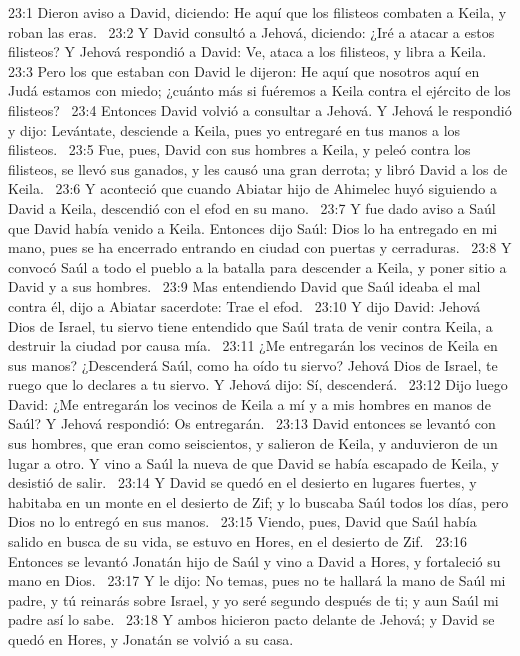 23:1 Dieron aviso a David, diciendo: He aquí que los filisteos combaten a Keila, y roban las eras.  
23:2 Y David consultó a Jehová, diciendo: ¿Iré a atacar a estos filisteos? Y Jehová respondió a David: Ve, ataca a los filisteos, y libra a Keila.  
23:3 Pero los que estaban con David le dijeron: He aquí que nosotros aquí en Judá estamos con miedo; ¿cuánto más si fuéremos a Keila contra el ejército de los filisteos?  
23:4 Entonces David volvió a consultar a Jehová. Y Jehová le respondió y dijo: Levántate, desciende a Keila, pues yo entregaré en tus manos a los filisteos.  
23:5 Fue, pues, David con sus hombres a Keila, y peleó contra los filisteos, se llevó sus ganados, y les causó una gran derrota; y libró David a los de Keila.  
23:6 Y aconteció que cuando Abiatar hijo de Ahimelec huyó siguiendo a David a Keila, descendió con el efod en su mano.  
23:7 Y fue dado aviso a Saúl que David había venido a Keila. Entonces dijo Saúl: Dios lo ha entregado en mi mano, pues se ha encerrado entrando en ciudad con puertas y cerraduras.  
23:8 Y convocó Saúl a todo el pueblo a la batalla para descender a Keila, y poner sitio a David y a sus hombres.  
23:9 Mas entendiendo David que Saúl ideaba el mal contra él, dijo a Abiatar sacerdote: Trae el efod.  
23:10 Y dijo David: Jehová Dios de Israel, tu siervo tiene entendido que Saúl trata de venir contra Keila, a destruir la ciudad por causa mía.  
23:11 ¿Me entregarán los vecinos de Keila en sus manos? ¿Descenderá Saúl, como ha oído tu siervo? Jehová Dios de Israel, te ruego que lo declares a tu siervo. Y Jehová dijo: Sí, descenderá.  
23:12 Dijo luego David: ¿Me entregarán los vecinos de Keila a mí y a mis hombres en manos de Saúl? Y Jehová respondió: Os entregarán.  
23:13 David entonces se levantó con sus hombres, que eran como seiscientos, y salieron de Keila, y anduvieron de un lugar a otro. Y vino a Saúl la nueva de que David se había escapado de Keila, y desistió de salir.  
23:14 Y David se quedó en el desierto en lugares fuertes, y habitaba en un monte en el desierto de Zif; y lo buscaba Saúl todos los días, pero Dios no lo entregó en sus manos.  
23:15 Viendo, pues, David que Saúl había salido en busca de su vida, se estuvo en Hores, en el desierto de Zif.  
23:16 Entonces se levantó Jonatán hijo de Saúl y vino a David a Hores, y fortaleció su mano en Dios.  
23:17 Y le dijo: No temas, pues no te hallará la mano de Saúl mi padre, y tú reinarás sobre Israel, y yo seré segundo después de ti; y aun Saúl mi padre así lo sabe.  
23:18 Y ambos hicieron pacto delante de Jehová; y David se quedó en Hores, y Jonatán se volvió a su casa.  
